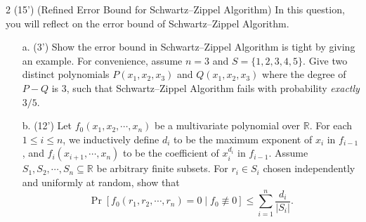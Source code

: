 \begin{question}{2 (15') (Refined Error Bound for Schwartz--Zippel Algorithm)}
In this question, you will reflect on the error bound of Schwartz--Zippel Algorithm. 
    \begin{itemize}
        \item[a. (3')] Show the error bound in Schwartz--Zippel Algorithm is tight by giving an example. For convenience, assume $n=3$ and $S=\{1,2,3,4,5\}$. Give two distinct polynomials $P(x_1,x_2,x_3)$ and $Q(x_1,x_2,x_3)$ where the degree of $P-Q$ is $3$, such that Schwartz--Zippel Algorithm fails with probability \textit{exactly} $3/5$.
        
        \item[b. (12')] Let $f_0(x_1,x_2,\cdots,x_n)$ be a multivariate polynomial over $\mathbb R$. For each $1\leq i\leq n$, we inductively define $d_i$ to be the maximum exponent of $x_i$ in $f_{i-1}$, and $f_i(x_{i+1},\cdots,x_n)$ to be the coefficient of $x_i^{d_i}$ in $f_{i-1}$. Assume $S_1,S_2,\cdots,S_n\subseteq\mathbb R$ be arbitrary finite subsets. For $r_i\in S_i$ chosen independently and uniformly at random, show that
        $$
        \Pr\left[f_0(r_1,r_2,\cdots,r_n)=0\middle|f_0\not\equiv0\right]
        \leq\sum_{i=1}^n\frac{d_i}{|S_i|}.
        $$
    \end{itemize}
\end{question}

